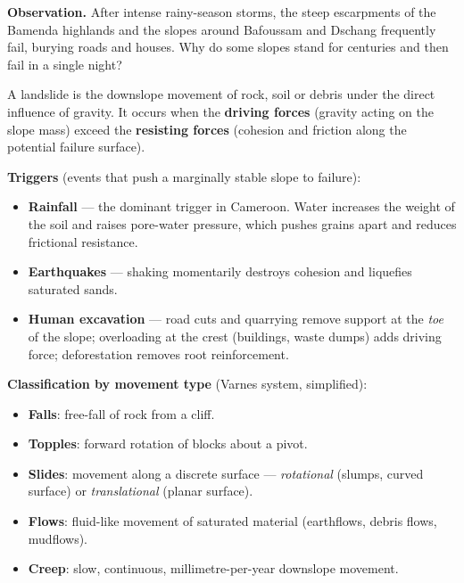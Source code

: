 \documentclass[11pt]{article}
\newcommand{\cle}[1]{{\popxbold\color{popdark}#1}}
\begin{document}
\textbf{Observation.} After intense rainy-season storms, the steep escarpments of the Bamenda highlands and the slopes around Bafoussam and Dschang frequently fail, burying roads and houses. Why do some slopes stand for centuries and then fail in a single night?

\begin{definition}[Landslide]
A \cle{landslide} is the downslope movement of rock, soil or debris under the direct influence of gravity. It occurs when the \textbf{driving forces} (gravity acting on the slope mass) exceed the \textbf{resisting forces} (cohesion and friction along the potential failure surface).
\end{definition}

\textbf{Triggers} (events that push a marginally stable slope to failure):
\begin{itemize}
\item \textbf{Rainfall} — the dominant trigger in Cameroon. Water increases the weight of the soil and raises \cle{pore-water pressure}, which pushes grains apart and reduces frictional resistance.
\item \textbf{Earthquakes} — shaking momentarily destroys cohesion and liquefies saturated sands.
\item \textbf{Human excavation} — road cuts and quarrying remove support at the \emph{toe} of the slope; overloading at the crest (buildings, waste dumps) adds driving force; deforestation removes root reinforcement.
\end{itemize}

\textbf{Classification by movement type} (Varnes system, simplified):
\begin{itemize}
\item \textbf{Falls}: free-fall of rock from a cliff.
\item \textbf{Topples}: forward rotation of blocks about a pivot.
\item \textbf{Slides}: movement along a discrete surface — \emph{rotational} (slumps, curved surface) or \emph{translational} (planar surface).
\item \textbf{Flows}: fluid-like movement of saturated material (earthflows, debris flows, mudflows).
\item \textbf{Creep}: slow, continuous, millimetre-per-year downslope movement.
\end{itemize}
\end{document}
